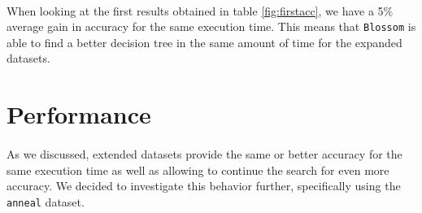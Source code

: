 \documentclass[12pt]{report}
\theoremstyle{definition}
\theoremstyle{definition}
\theoremstyle{definition}
\begin{document}
\paragraph{} When looking at the first results obtained in table \ref{fig:firstacc}, we have a 5\% average gain in
accuracy for the same execution time. This means that \texttt{Blossom} is able to find a better decision tree in the
same amount of time for the expanded datasets.

\newpage

\section{Performance}
\paragraph{} As we discussed, extended datasets provide the same or better accuracy for the same execution time as well
as allowing to continue the search for even more accuracy. We decided to investigate this behavior further, specifically
using the \texttt{anneal} dataset.
\end{document}
